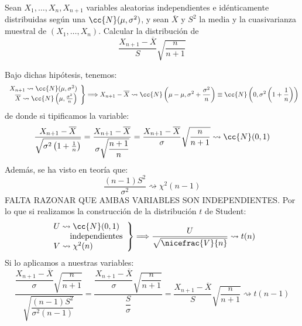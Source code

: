 \begin{ejercicio}
    Sean $X_1, \ldots, X_n, X_{n+1}$ variables aleatorias independientes e idénticamente distribuidas según una $\cc{N}(\mu, \sigma^2)$, y sean $\overline{X}$ y $S^2$ la media y la cuasivarianza muestral de $(X_1, \ldots, X_n)$. Calcular la distribución de
    \begin{equation*}
        \dfrac{X_{n+1}- \overline{X}}{S}\sqrt{\dfrac{n}{n+1}}
    \end{equation*}

    \noindent
    Bajo dichas hipótesis, tenemos:
    \begin{equation*}
        \left.\begin{array}{r}
            X_{n+1} \rightsquigarrow \cc{N}(\mu, \sigma^2) \\
            \overline{X} \rightsquigarrow \cc{N}\left(\mu, \frac{\sigma^2}{n}\right)
    \end{array}\right\}\Longrightarrow X_{n+1}-\overline{X} \rightsquigarrow\cc{N}\left(\mu-\mu, \sigma^2 + \frac{\sigma^2}{n}\right) \equiv \cc{N}\left(0, \sigma^2\left(1+\frac{1}{n}\right)\right)
    \end{equation*}
    de donde si tipificamos la variable:
    \begin{equation*}
        \dfrac{X_{n+1}-\overline{X}}{\sqrt{\sigma^2\left(1+\frac{1}{n}\right)}} = \dfrac{X_{n+1}-\overline{X}}{\sigma\sqrt{\dfrac{n+1}{n}}} = \dfrac{X_{n+1}-\overline{X}}{\sigma}\sqrt{\dfrac{n}{n+1}}\rightsquigarrow \cc{N}(0,1)
    \end{equation*}
    Además, se ha visto en teoría que:
    \begin{equation*}
        \dfrac{(n-1)S^2}{\sigma^2} \rightsquigarrow\chi^2(n-1)
    \end{equation*}
    FALTA RAZONAR QUE AMBAS VARIABLES SON INDEPENDIENTES. Por lo que si realizamos la construcción de la distribución $t$ de Student:
    \begin{equation*}
        \left.\begin{array}{l}
                U\rightsquigarrow \cc{N}(0,1) \\
                \qquad \text{independientes} \\
                V\rightsquigarrow\chi^2(n)
        \end{array}\right\} \Longrightarrow \dfrac{U}{\sqrt{\nicefrac{V}{n}}} \rightsquigarrow t(n)
    \end{equation*}
    Si lo aplicamos a nuestras variables:
    \begin{equation*}
        \dfrac{\dfrac{X_{n+1}-\overline{X}}{\sigma}\sqrt{\dfrac{n}{n+1}}}{\sqrt{\dfrac{(n-1)S^2}{\sigma^2(n-1)}}} = \dfrac{\dfrac{X_{n+1}-\overline{X}}{\sigma}\sqrt{\dfrac{n}{n+1}}}{\dfrac{S}{\sigma}} = \dfrac{X_{n+1}- \overline{X}}{S}\sqrt{\dfrac{n}{n+1}} \rightsquigarrow t(n-1)
    \end{equation*}
\end{ejercicio}

